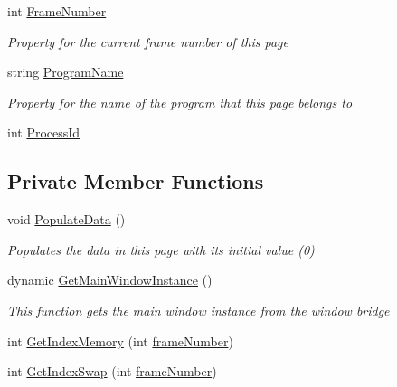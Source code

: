 \begin{DoxyCompactItemize}
int \hyperlink{class_c_p_u___o_s___simulator_1_1_memory_1_1_memory_page_a89857b70d4065fdc15ce2ea577a7f0ff}{Frame\+Number}
\begin{DoxyCompactList}\small\item\em Property for the current frame number of this page \end{DoxyCompactList}\item 
string \hyperlink{class_c_p_u___o_s___simulator_1_1_memory_1_1_memory_page_a22a8274576829c0a4e769189a8d10a9e}{Program\+Name}
\begin{DoxyCompactList}\small\item\em Property for the name of the program that this page belongs to \end{DoxyCompactList}\item 
int \hyperlink{class_c_p_u___o_s___simulator_1_1_memory_1_1_memory_page_ad04c26f23d3be2e3d664ee8982b0f738}{Process\+Id}
\end{DoxyCompactItemize}
\subsection*{Private Member Functions}
\begin{DoxyCompactItemize}
\item 
void \hyperlink{class_c_p_u___o_s___simulator_1_1_memory_1_1_memory_page_a4006da1460cb3bf17076dfbade9d0038}{Populate\+Data} ()
\begin{DoxyCompactList}\small\item\em Populates the data in this page with its initial value (0) \end{DoxyCompactList}\item 
dynamic \hyperlink{class_c_p_u___o_s___simulator_1_1_memory_1_1_memory_page_a84a305171941df5c3ae72b34ccec5485}{Get\+Main\+Window\+Instance} ()
\begin{DoxyCompactList}\small\item\em This function gets the main window instance from the window bridge \end{DoxyCompactList}\item 
int \hyperlink{class_c_p_u___o_s___simulator_1_1_memory_1_1_memory_page_ae2fa532bdd07c5c939602ea5b223a2d2}{Get\+Index\+Memory} (int \hyperlink{class_c_p_u___o_s___simulator_1_1_memory_1_1_memory_page_aa2201f66e00641ff4eb07f881ac5413f}{frame\+Number})
\item 
int \hyperlink{class_c_p_u___o_s___simulator_1_1_memory_1_1_memory_page_a88d1bc7d56177569f81a9d1289022598}{Get\+Index\+Swap} (int \hyperlink{class_c_p_u___o_s___simulator_1_1_memory_1_1_memory_page_aa2201f66e00641ff4eb07f881ac5413f}{frame\+Number})
\end{DoxyCompactItemize}
